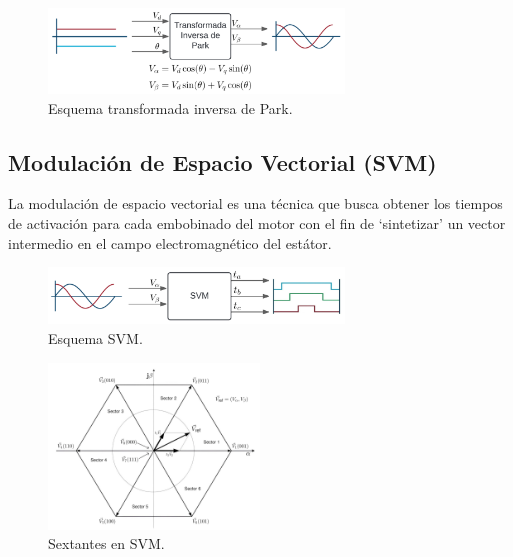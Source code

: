 \documentclass[11pt]{report}
\begin{document}
\begin{figure}[ht]
	\centering
	\includegraphics[width=0.7\textwidth]{imagenes/park_inv.png}
	\caption{Esquema transformada inversa de Park.}
\end{figure}
\FloatBarrier


\subsection{Modulación de Espacio Vectorial (SVM)}
La modulación de espacio vectorial es una técnica que busca obtener los tiempos de activación para cada embobinado del motor con el fin de ‘sintetizar’ un vector intermedio en el campo electromagnético del estátor.

\begin{figure}[ht]
	\centering
	\includegraphics[width=0.7\textwidth]{imagenes/SVM.png}
	\caption{Esquema SVM.}
\end{figure}
\FloatBarrier

\begin{figure}[ht]
	\centering
	\includegraphics[width=0.5\textwidth]{imagenes/sectantes.png}
	\caption{Sextantes en SVM.}
\end{figure}
\FloatBarrier
\end{document}
